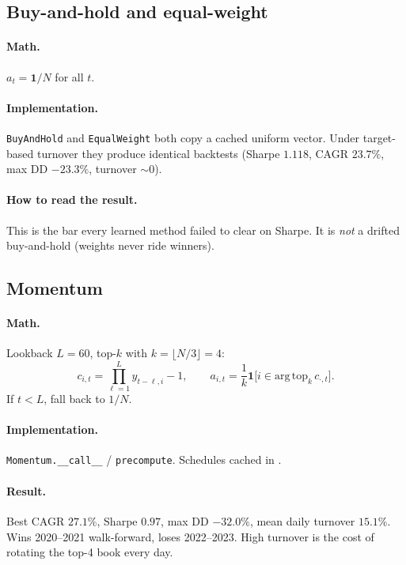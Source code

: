\documentclass[11pt]{article}
\begin{document}
\subsection{Buy-and-hold and equal-weight}

\paragraph{Math.} $a_t=\mathbf{1}/N$ for all $t$.

\paragraph{Implementation.}
\texttt{BuyAndHold} and \texttt{EqualWeight} both copy a cached uniform vector.
Under target-based turnover they produce identical backtests
(Sharpe $1.118$, CAGR $23.7\%$, max DD $-23.3\%$, turnover $\sim 0$).

\paragraph{How to read the result.}
This is the bar every learned method failed to clear on Sharpe.
It is \emph{not} a drifted buy-and-hold (weights never ride winners).

\subsection{Momentum}

\paragraph{Math.}
Lookback $L=60$, top-$k$ with $k=\lfloor N/3\rfloor=4$:
\begin{equation}
c_{i,t}=\prod_{\ell=1}^{L} y_{t-\ell,i}-1,\qquad
a_{i,t}=\frac{1}{k}\mathbf{1}\bigl[i\in\mathrm{arg\,top}_k\,c_{\cdot,t}\bigr].
\end{equation}
If $t<L$, fall back to $1/N$.

\paragraph{Implementation.}
\texttt{Momentum.\_\_call\_\_} / \texttt{precompute}.
Schedules cached in .

\paragraph{Result.}
Best CAGR $27.1\%$, Sharpe $0.97$, max DD $-32.0\%$, mean daily turnover $15.1\%$.
Wins 2020--2021 walk-forward, loses 2022--2023.
High turnover is the cost of rotating the top-4 book every day.
\end{document}
